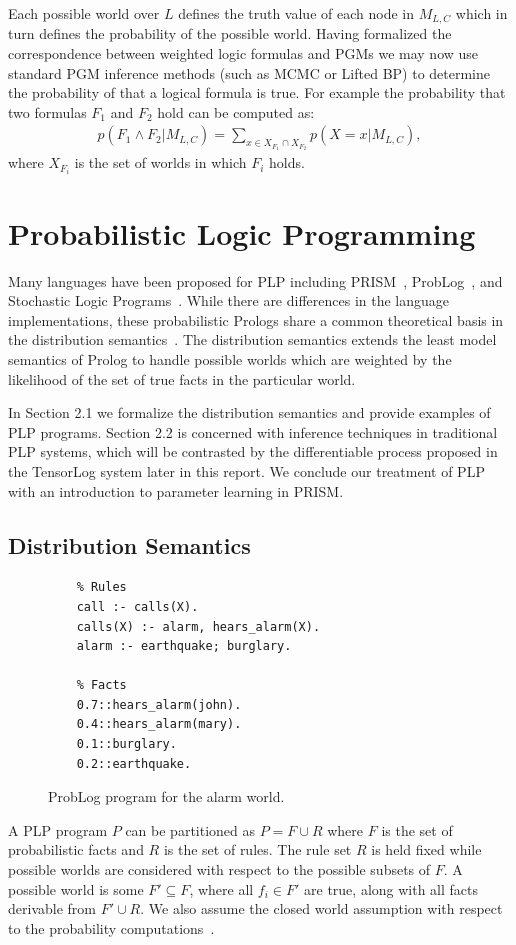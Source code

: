 \documentclass[11pt]{article}
\begin{document}
Each possible world over $L$ defines the truth value of each node in $M_{L, C}$ which in turn defines the probability of the possible world.  Having formalized the correspondence between weighted logic formulas and PGMs we may now use standard PGM inference methods (such as MCMC or Lifted BP) to determine the probability of that a logical formula is true.  For example the probability that two formulas $F_1$ and $F_2$ hold can be computed as:
\begin{gather*}
p(F_1 \land F_2 | M_{L, C}) = \sum_{x \in X_{F_1} \cap X_{F_2}} p(X=x | M_{L, C}),
\end{gather*}
where $X_{F_i}$ is the set of worlds in which $F_i$ holds.

\section{Probabilistic Logic Programming}
Many languages have been proposed for PLP including PRISM~\cite{Sato:1997:PLS:1622270.1622348}, ProbLog~\cite{DeRaedt:2007:PPP:1625275.1625673}, and Stochastic Logic Programs~\cite{Muggleton96stochasticlogic}.  While there are differences in the language implementations, these probabilistic Prologs share a common theoretical basis in the distribution semantics~\cite{Sato95astatistical}.  The distribution semantics extends the least model semantics of Prolog to handle possible worlds which are weighted by the likelihood of the set of true facts in the particular world.  

In Section 2.1 we formalize the distribution semantics and provide examples of PLP programs.  Section 2.2 is concerned with inference techniques in traditional PLP systems, which will be contrasted by the differentiable process proposed in the TensorLog system later in this report.  We conclude our treatment of PLP with an introduction to parameter learning in PRISM.

\subsection{Distribution Semantics}
\begin{figure}
	\begin{verbatim}
	% Rules
	call :- calls(X).
	calls(X) :- alarm, hears_alarm(X).
	alarm :- earthquake; burglary.
	
	% Facts
	0.7::hears_alarm(john).
	0.4::hears_alarm(mary).
	0.1::burglary.
	0.2::earthquake.
	\end{verbatim}
	\caption{ProbLog program for the alarm world.}
\end{figure}
A PLP program $P$ can be partitioned as $P = F \cup R$ where $F$ is the set of probabilistic facts and $R$ is the set of rules.  The rule set $R$ is held fixed while possible worlds are considered with respect to the possible subsets of $F$.  A possible world is some $F' \subseteq F$, where all $f_i \in F'$ are true, along with all facts derivable from $F' \cup R$.  We also assume the closed world assumption with respect to the probability computations~\cite{Getoor:2007:ISR:1296231}.
\end{document}
